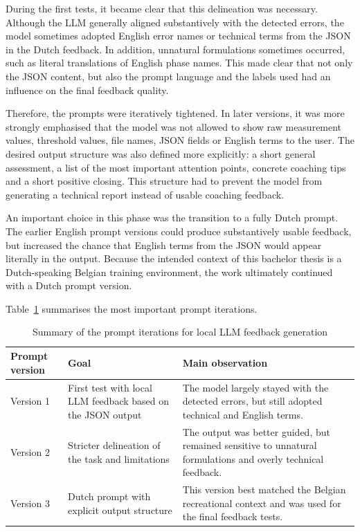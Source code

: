 During the first tests, it became clear that this delineation was necessary. Although the LLM generally aligned substantively with the detected errors, the model sometimes adopted English error names or technical terms from the JSON in the Dutch feedback. In addition, unnatural formulations sometimes occurred, such as literal translations of English phase names. This made clear that not only the JSON content, but also the prompt language and the labels used had an influence on the final feedback quality.

Therefore, the prompts were iteratively tightened. In later versions, it was more strongly emphasised that the model was not allowed to show raw measurement values, threshold values, file names, JSON fields or English terms to the user. The desired output structure was also defined more explicitly: a short general assessment, a list of the most important attention points, concrete coaching tips and a short positive closing. This structure had to prevent the model from generating a technical report instead of usable coaching feedback.

An important choice in this phase was the transition to a fully Dutch prompt. The earlier English prompt versions could produce substantively usable feedback, but increased the chance that English terms from the JSON would appear literally in the output. Because the intended context of this bachelor thesis is a Dutch-speaking Belgian training environment, the work ultimately continued with a Dutch prompt version.

Table~\ref{tab:prompt_iterations} summarises the most important prompt iterations.

\begin{table}[H]
    \centering
    \footnotesize
    \begin{tabular}{p{2.4cm}p{4.2cm}p{5.8cm}}
        \toprule
        \textbf{Prompt version} & \textbf{Goal} & \textbf{Main observation} \\
        \midrule
        Version 1 & First test with local LLM feedback based on the JSON output & The model largely stayed with the detected errors, but still adopted technical and English terms. \\
        Version 2 & Stricter delineation of the task and limitations & The output was better guided, but remained sensitive to unnatural formulations and overly technical feedback. \\
        Version 3 & Dutch prompt with explicit output structure & This version best matched the Belgian recreational context and was used for the final feedback tests. \\
        \bottomrule
    \end{tabular}
    \caption{Summary of the prompt iterations for local LLM feedback generation}
    \label{tab:prompt_iterations}
\end{table}

